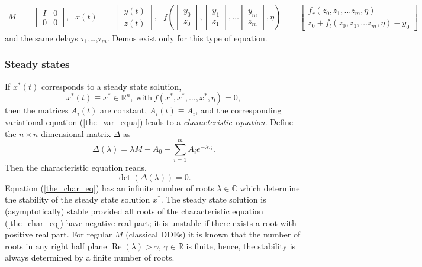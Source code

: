 \documentclass[10pt]{scrartcl}
\newcommand{\define}[1]{\emph{#1}}
\newcommand{\RR}{\mathbb{R}}
\newcommand{\CC}{\mathbb{C}}
\renewcommand{\Re}{\operatorname{Re}}
\begin{document}
\begin{align*}
  M&=
  \begin{bmatrix}
    I&0 \\ 0&0 
  \end{bmatrix}\mbox{,}&
  x(t)&=
  \begin{bmatrix}
    y(t)\\ z(t)
  \end{bmatrix}\mbox{,}&
  f\left(
    \begin{bmatrix}
      y_0\\ z_0
    \end{bmatrix}
,     \begin{bmatrix}
      y_1\\ z_1
    \end{bmatrix}
    ,\ldots
        \begin{bmatrix}
      y_m\\ z_m
    \end{bmatrix},\eta\right)&=
  \begin{bmatrix}
    f_r(z_0,z_1,\ldots z_m,\eta)\\
    z_0+f_l(z_0,z_1,\ldots z_m,\eta)-y_0
  \end{bmatrix}
\end{align*}
and the same delays $\tau_1$,\ldots,$\tau_m$. Demos exist only for this type of equation.

\subsubsection{Steady states}
\label{sec:dde:stst}
If $x^*(t)$ corresponds to a steady state solution,
\[
x^*(t)\equiv x^*\in\RR^n,\mathrm{\ with\ }f(x^*,x^*,\ldots,x^*,\eta)=0,
\]
then the matrices 
$A_i(t)$ are constant, $A_i(t)\equiv A_i$, and the corresponding 
variational equation (\ref{the_var_equa})
leads to a \define{characteristic equation}. Define the $n\times n$-dimensional
matrix $\Delta$ as
\begin{equation}
  \Delta(\lambda)=\lambda M - A_0 - \sum_{i=1}^m A_i e^{-\lambda\tau_i}.
\label{eq:deltadef}
\end{equation}
Then the characteristic equation reads,
\begin{equation}\label{the_char_eq}
\det(\Delta(\lambda))=0.
\end{equation}
Equation (\ref{the_char_eq}) has an infinite number of roots
$\lambda\in\CC$ which determine the stability of the steady state
solution $x^*$.  The steady state solution is (asymptotically) stable
provided all roots of the characteristic equation (\ref{the_char_eq})
have negative real part; it is unstable if there exists a root with
positive real part. For regular $M$ (classical DDEs) it is known that
the number of roots in any right half plane $\Re(\lambda)>\gamma$,
$\gamma\in\RR$ is finite, hence, the stability is always determined by
a finite number of roots.
\end{document}
